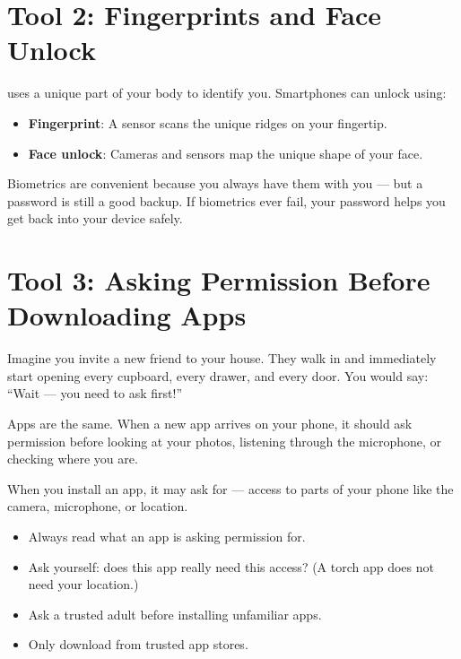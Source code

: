 \sectionrule

\section*{Tool 2: Fingerprints and Face Unlock}

 uses a unique part of your body to identify you.
Smartphones can unlock using:
\begin{itemize}
  \item \textbf{Fingerprint}: A sensor scans the unique ridges on your fingertip.
  \item \textbf{Face unlock}: Cameras and sensors map the unique shape of your face.
\end{itemize}

Biometrics are convenient because you always have them with you —
but a password is still a good backup.
If biometrics ever fail, your password helps you get back into your device safely.

\sectionrule

\section*{Tool 3: Asking Permission Before Downloading Apps}

\begin{picturethis}
  Imagine you invite a new friend to your house.
  They walk in and immediately start opening every cupboard, every drawer, and every door.
  You would say: ``Wait — you need to ask first!''

  Apps are the same. When a new app arrives on your phone,
  it should ask permission before looking at your photos, listening through
  the microphone, or checking where you are.
\end{picturethis}

When you install an app, it may ask for  —
access to parts of your phone like the camera, microphone, or location.

\begin{itemize}
  \item Always read what an app is asking permission for.
  \item Ask yourself: does this app really need this access?
        (A torch app does not need your location.)
  \item Ask a trusted adult before installing unfamiliar apps.
  \item Only download from trusted app stores.
\end{itemize}

